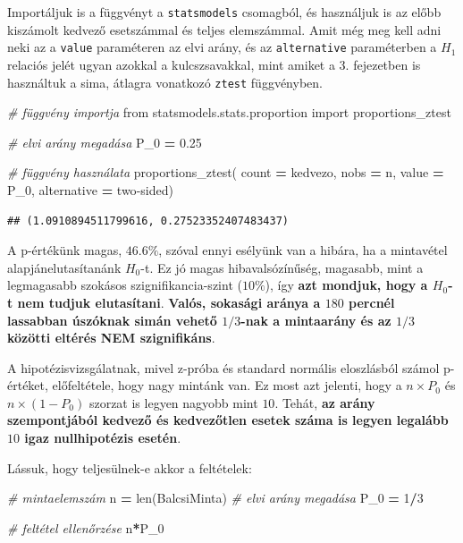 \documentclass[
]{book}
\newenvironment{Shaded}{\begin{snugshade}}{\end{snugshade}}
\newcommand{\BuiltInTok}[1]{#1}
\newcommand{\CommentTok}[1]{\textcolor[rgb]{0.56,0.35,0.01}{\textit{#1}}}
\newcommand{\DecValTok}[1]{\textcolor[rgb]{0.00,0.00,0.81}{#1}}
\newcommand{\FloatTok}[1]{\textcolor[rgb]{0.00,0.00,0.81}{#1}}
\newcommand{\ImportTok}[1]{#1}
\newcommand{\NormalTok}[1]{#1}
\newcommand{\OperatorTok}[1]{\textcolor[rgb]{0.81,0.36,0.00}{\textbf{#1}}}
\newcommand{\StringTok}[1]{\textcolor[rgb]{0.31,0.60,0.02}{#1}}
\begin{document}
Importáljuk is a függvényt a \texttt{statsmodels} csomagból, és használjuk is az előbb kiszámolt kedvező esetszámmal és teljes elemszámmal. Amit még meg kell adni neki az a \texttt{value} paraméteren az elvi arány, és az \texttt{alternative} paraméterben a \(H_1\) relaciós jelét ugyan azokkal a kulcszsavakkal, mint amiket a 3. fejezetben is használtuk a sima, átlagra vonatkozó \texttt{ztest} függvényben.

\begin{Shaded}
\begin{Highlighting}[]
\CommentTok{\# függvény importja}
\ImportTok{from}\NormalTok{ statsmodels.stats.proportion }\ImportTok{import}\NormalTok{ proportions\_ztest}

\CommentTok{\# elvi arány megadása}
\NormalTok{P\_0 }\OperatorTok{=} \FloatTok{0.25}

\CommentTok{\# függvény használata}
\NormalTok{proportions\_ztest(}
\NormalTok{  count }\OperatorTok{=}\NormalTok{ kedvezo,}
\NormalTok{  nobs }\OperatorTok{=}\NormalTok{ n,}
\NormalTok{  value }\OperatorTok{=}\NormalTok{ P\_0,}
\NormalTok{  alternative }\OperatorTok{=} \StringTok{\textquotesingle{}two{-}sided\textquotesingle{}}\NormalTok{)}
\end{Highlighting}
\end{Shaded}

\begin{verbatim}
## (1.0910894511799616, 0.27523352407483437)
\end{verbatim}

A p-értékünk magas, \(46.6\%\), szóval ennyi esélyünk van a hibára, ha a mintavétel alapjánelutasítanánk \(H_0\)-t. Ez jó magas hibavalsózínűség, magasabb, mint a legmagasabb szokásos szignifikancia-szint (\(10\%\)), így \textbf{azt mondjuk, hogy a \(H_0\)-t nem tudjuk elutasítani}. \textbf{Valós, sokasági aránya a \(180\) percnél lassabban úszóknak simán vehető \(1/3\)-nak a mintaarány és az \(1/3\) közötti eltérés NEM szignifikáns}.

A hipotézisvizsgálatnak, mivel z-próba és standard normális eloszlásból számol p-értéket, előfeltétele, hogy nagy mintánk van. Ez most azt jelenti, hogy a \(n \times P_0\) és \(n \times (1-P_0)\) szorzat is legyen nagyobb mint \(10\). Tehát, \textbf{az arány szempontjából kedvező és kedvezőtlen esetek száma is legyen legalább \(10\) igaz nullhipotézis esetén}.

Lássuk, hogy teljesülnek-e akkor a feltételek:

\begin{Shaded}
\begin{Highlighting}[]
\CommentTok{\# mintaelemszám}
\NormalTok{n }\OperatorTok{=} \BuiltInTok{len}\NormalTok{(BalcsiMinta)}
\CommentTok{\# elvi arány megadása}
\NormalTok{P\_0 }\OperatorTok{=} \DecValTok{1}\OperatorTok{/}\DecValTok{3}

\CommentTok{\# feltétel ellenőrzése}
\NormalTok{n}\OperatorTok{*}\NormalTok{P\_0}
\end{Highlighting}
\end{Shaded}
\end{document}
